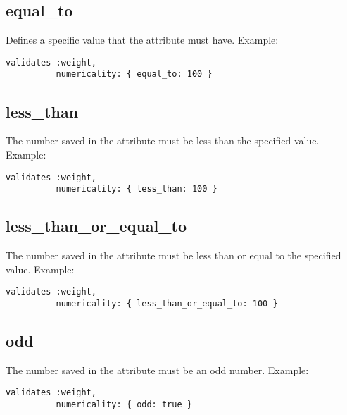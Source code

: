 \documentclass[a4paper]{book}
\begin{document}
\subsection{equal\_to}\label{equalux5fto}

Defines a specific value that the attribute must have. Example:

\begin{shaded}\begin{verbatim}
validates :weight,
          numericality: { equal_to: 100 }
\end{verbatim}\end{shaded}

\subsection{less\_than}\label{lessux5fthan}

The number saved in the attribute must be less than the specified value. Example:

\begin{shaded}\begin{verbatim}
validates :weight,
          numericality: { less_than: 100 }
\end{verbatim}\end{shaded}

\subsection{less\_than\_or\_equal\_to}\label{lessux5fthanux5forux5fequalux5fto}

The number saved in the attribute must be less than or equal to the specified value. Example:

\begin{shaded}\begin{verbatim}
validates :weight,
          numericality: { less_than_or_equal_to: 100 }
\end{verbatim}\end{shaded}

\subsection{odd}\label{odd}

The number saved in the attribute must be an odd number. Example:

\begin{shaded}\begin{verbatim}
validates :weight,
          numericality: { odd: true }
\end{verbatim}\end{shaded}
\end{document}
